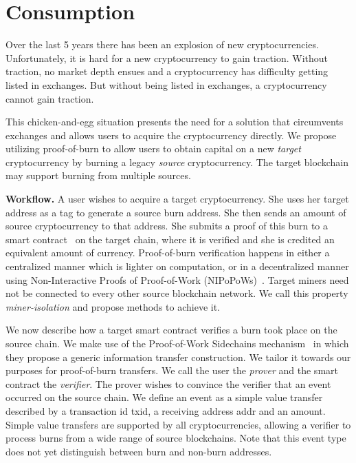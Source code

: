 \section{Consumption}

Over the last 5 years there has been an explosion of new cryptocurrencies. Unfortunately, it is hard for a new cryptocurrency to gain traction. Without traction, no market depth ensues and a cryptocurrency has difficulty getting listed in exchanges. But without being listed in exchanges, a cryptocurrency cannot gain traction.

This chicken-and-egg situation presents the need for a solution that circumvents exchanges and allows users to acquire the cryptocurrency directly. We propose utilizing proof-of-burn to allow users to obtain capital on a new \emph{target} cryptocurrency by burning a legacy \emph{source} cryptocurrency. The target blockchain may support burning from multiple sources.

\noindent
\textbf{Workflow.}
A user wishes to acquire a target cryptocurrency. She uses her target address as a tag to generate a source burn address. She then sends an amount of source cryptocurrency to that address. She submits a proof of this burn to a smart contract~\cite{buterin} on the target chain, where it is verified and she is credited an equivalent amount of currency. Proof-of-burn verification happens in either a centralized manner which is lighter on computation, or in a decentralized manner using Non-Interactive Proofs of Proof-of-Work (NIPoPoWs)~\ifanonymous\cite{FCW:KiaLamSto16,nipopows,flyclient}\else\cite{FCW:KiaLamSto16,nipopows,superblocks,gtklocker,flyclient}\fi. Target miners need not be connected to every other source blockchain network. We call this property \emph{miner-isolation} and propose methods to achieve it.

We now describe how a target smart contract verifies a burn took place on the source chain. We make use of the Proof-of-Work Sidechains mechanism~\cite{pow-sidechains} in which they propose a generic information transfer construction. We tailor it towards our purposes for proof-of-burn transfers. We call the user the \emph{prover} and the smart contract the \emph{verifier}. The prover wishes to convince the verifier that an event occurred on the source chain. We define an event as a simple value transfer described by a transaction id \textsf{txid}, a receiving address \textsf{addr} and an \textsf{amount}. Simple value transfers are supported by all cryptocurrencies, allowing a verifier to process burns from a wide range of source blockchains. Note that this event type does not yet distinguish between burn and non-burn addresses.

